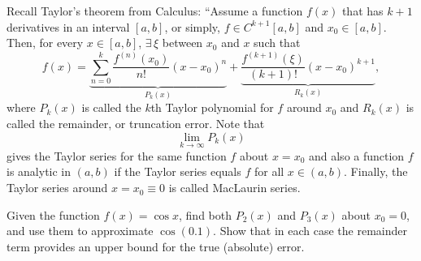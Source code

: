 \documentclass[a4paper,12pt,answers,addpoints]{exam}
\begin{document}
\begin{questions}




\question Recall Taylor's theorem from Calculus:
``Assume a function $f(x)$ that has $k+1$ derivatives in an interval 
$\left[a,b\right]$, or simply, $f\in C^{k+1}\left[a,b\right]$ and 
$x_{0}\in \left[a,b\right]$. Then, for every $x\in \left[a,b\right]$,
$\exists\,\xi$ between $x_{0}$ and $x$ such that 
%
\begin{equation} 
f(x) = \underbrace{\sum_{n=0}^{k}\frac{f^{(n)}(x_{0})}{n!}\left(x-x_{0}\right)^{n}}_{P_{k}(x)}%
+ \underbrace{\frac{f^{(k+1)}(\xi)}{(k+1)!}\left(x-x_{0}\right)^{k+1}}_{R_{k}(x)},
\label{taylor_thm}
\end{equation}
%
where $P_{k}(x)$ is called the $k$th Taylor polynomial for $f$ around $x_{0}$ 
and $R_{k}(x)$ is called the remainder, or truncation error. Note that 
$$\lim_{k\to \infty}P_{k}(x)$$ gives the Taylor series for the 
same function $f$ about $x=x_{0}$ and also a function $f$ is analytic in 
$\left(a,b\right)$ if the Taylor series equals $f$ for all $x\in\left(a,b\right)$.
Finally, the Taylor series around $x=x_{0}\equiv 0$ is called MacLaurin series.



\question[15] Given the function $f(x)=\cos{x}$, find both $P_{2}(x)$
and $P_{3}(x)$ about $x_{0}=0$, and use them to approximate
$\cos{(0.1)}$. Show that in each case the remainder term provides
an upper bound for the true (absolute) error.



\end{questions}
\end{document}
